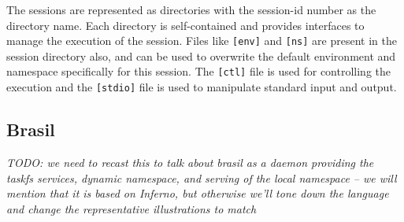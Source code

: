 The sessions are represented as directories with the session-id number as 
the directory name.
Each directory is  self-contained and provides interfaces to manage the
execution of the session.  Files like \texttt{[env]} and \texttt{[ns]} are
present in the session directory also, and can be used to overwrite the 
default environment and namespace specifically for this session.  
The \texttt{[ctl]} file is used for controlling the execution and 
the \texttt{[stdio]} file is used to manipulate standard input and output.  

%  

\subsection{Brasil}
\emph{TODO: we need to recast this to talk about brasil as a daemon providing
the taskfs services, dynamic namespace, and serving of the local namespace --
we will mention that it is based on Inferno, but otherwise we'll tone down
the language and change the representative illustrations to match}

